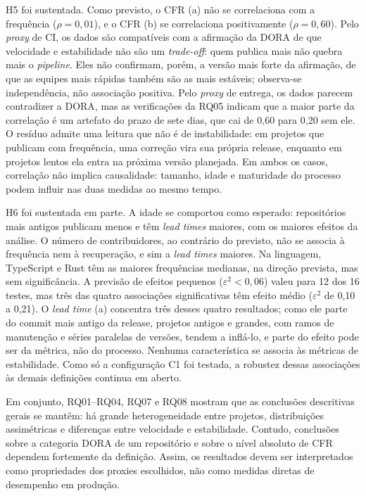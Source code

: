 \documentclass[12pt]{article}
\begin{document}
H5 foi sustentada. Como previsto, o CFR (a) não se correlaciona com a
frequência ($\rho=0{,}01$), e o CFR (b) se correlaciona positivamente
($\rho=0{,}60$). Pelo \textit{proxy} de CI, os dados são compatíveis com a
afirmação da DORA de que velocidade e estabilidade não são um
\textit{trade-off}: quem publica mais não quebra mais o \textit{pipeline}.
Eles não confirmam, porém, a versão mais forte da afirmação, de que as
equipes mais rápidas também são as mais estáveis; observa-se independência,
não associação positiva. Pelo \textit{proxy} de entrega, os dados parecem
contradizer a DORA, mas as verificações da RQ05 indicam que a maior parte da
correlação é um artefato do prazo de sete dias, que cai de 0,60 para 0,20
sem ele. O resíduo admite uma leitura que não é de instabilidade: em
projetos que publicam com frequência, uma correção vira sua própria release,
enquanto em projetos lentos ela entra na próxima versão planejada. Em ambos
os casos, correlação não implica causalidade: tamanho, idade e maturidade do
processo podem influir nas duas medidas ao mesmo tempo.

H6 foi sustentada em parte. A idade se comportou como esperado: repositórios
mais antigos publicam menos e têm \textit{lead times} maiores, com os
maiores efeitos da análise. O número de contribuidores, ao contrário do
previsto, não se associa à frequência nem à recuperação, e sim a
\textit{lead times} maiores. Na linguagem, TypeScript e Rust têm as maiores
frequências medianas, na direção prevista, mas sem significância. A previsão
de efeitos pequenos ($\varepsilon^2<0{,}06$) valeu para 12 dos 16 testes,
mas três das quatro associações significativas têm efeito médio
($\varepsilon^2$ de 0,10 a 0,21). O \textit{lead time} (a) concentra três
desses quatro resultados; como ele parte do commit mais antigo da release,
projetos antigos e grandes, com ramos de manutenção e séries paralelas de
versões, tendem a inflá-lo, e parte do efeito pode ser da métrica, não do
processo. Nenhuma característica se associa às métricas de estabilidade.
Como só a configuração C1 foi testada, a robustez dessas associações às
demais definições continua em aberto.

Em conjunto, RQ01--RQ04, RQ07 e RQ08 mostram que as conclusões descritivas
gerais se mantêm: há grande heterogeneidade entre projetos, distribuições
assimétricas e diferenças entre velocidade e estabilidade. Contudo,
conclusões sobre a categoria DORA de um repositório e sobre o nível absoluto
de CFR dependem fortemente da definição. Assim, os resultados devem ser
interpretados como propriedades dos proxies escolhidos, não como medidas
diretas de desempenho em produção.
\end{document}
